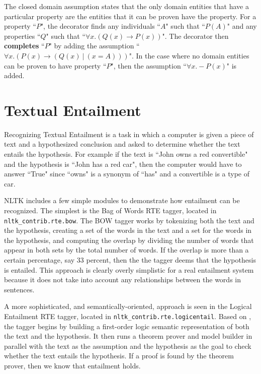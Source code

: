 \documentclass[11pt]{article}
\newcommand{\dhgcode}[1]{{\tt #1}}
\begin{document}
The closed domain assumption states that the only domain entities that have a particular property are the entities that it can be proven have the property.  For a property ``$P$", the decorator finds any individuals ``$A$" such that ``$P(A)$" and any properties ``$Q$" such that ``$\forall x.(Q(x) \rightarrow P(x))$".  The decorator then \textbf{completes} ``$P$" by adding the assumption ``$\forall x.(P(x) \rightarrow (Q(x)~|~(x = A)))$".  In the case where no domain entities can be proven to have property ``$P$", then the assumption ``$\forall x.-P(x)$" is added.


\section{Textual Entailment}
Recognizing Textual Entailment is a task in which a computer is given a piece of text and a hypothesized conclusion and asked to determine whether the text entails the hypothesis.  For example if the text is ``John owns a red convertible" and the hypothesis is ``John has a red car", then the computer would have to answer ``True" since ``owns" is a synonym of ``has" and a convertible is a type of car.  

NLTK includes a few simple modules to demonstrate how entailment can be recognized.  The simplest is the Bag of Words RTE tagger, located in \dhgcode{nltk\_contrib.rte.bow}.  The BOW tagger works by tokenizing both the text and the hypothesis, creating a set of the words in the text and a set for the words in the hypothesis, and computing the overlap by dividing the number of words that appear in both sets by the total number of words.  If the overlap is more than a certain percentage, say 33 percent, then the the tagger deems that the hypothesis is entailed.  This approach is clearly overly simplistic for a real entailment system because it does not take into account any relationships between the words in sentences.

A more sophisticated, and semantically-oriented, approach is seen in the Logical Entailment RTE tagger, located in \dhgcode{nltk\_contrib.rte.logicentail}.  Based on \cite{BosRTE}, the tagger begins by building a first-order logic semantic representation of both the text and the hypothesis.  It then runs a theorem prover and model builder in parallel with the text as the assumption and the hypothesis as the goal to check whether the text entails the hypothesis.  If a proof is found by the theorem prover, then we know that entailment holds.
\end{document}

